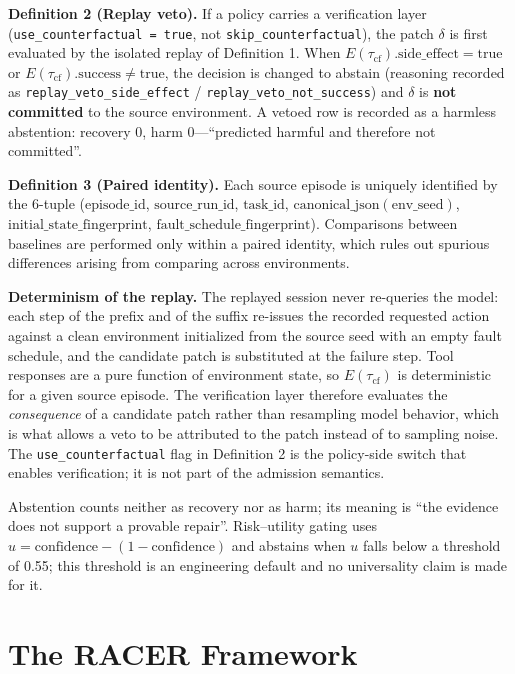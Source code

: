 \documentclass[review]{fcs}
\begin{document}
\textbf{Definition 2 (Replay veto).} If a policy carries a verification layer (\texttt{use\_counterfactual = true}, not \texttt{skip\_counterfactual}), the patch $\delta$ is first evaluated by the isolated replay of Definition 1. When $E(\tau_{\text{cf}}).\text{side\_effect} = \text{true}$ or $E(\tau_{\text{cf}}).\text{success} \neq \text{true}$, the decision is changed to abstain (reasoning recorded as \texttt{replay\_veto\_side\_effect} / \texttt{replay\_veto\_not\_success}) and $\delta$ is \textbf{not committed} to the source environment. A vetoed row is recorded as a harmless abstention: recovery 0, harm 0---``predicted harmful and therefore not committed''.

\textbf{Definition 3 (Paired identity).} Each source episode is uniquely identified by the 6-tuple ($\text{episode\_id}$, $\text{source\_run\_id}$, $\text{task\_id}$, $\text{canonical\_json}(\text{env\_seed})$, $\text{initial\_state\_fingerprint}$, $\text{fault\_schedule\_fingerprint}$). Comparisons between baselines are performed only within a paired identity, which rules out spurious differences arising from comparing across environments.

\textbf{Determinism of the replay.} The replayed session never re-queries the model: each step of the prefix and of the suffix re-issues the recorded requested action against a clean environment initialized from the source seed with an empty fault schedule, and the candidate patch is substituted at the failure step. Tool responses are a pure function of environment state, so $E(\tau_{\text{cf}})$ is deterministic for a given source episode. The verification layer therefore evaluates the \emph{consequence} of a candidate patch rather than resampling model behavior, which is what allows a veto to be attributed to the patch instead of to sampling noise. The \texttt{use\_counterfactual} flag in Definition 2 is the policy-side switch that enables verification; it is not part of the admission semantics.

Abstention counts neither as recovery nor as harm; its meaning is ``the evidence does not support a provable repair''. Risk--utility gating uses $u = \text{confidence} - (1 - \text{confidence})$ and abstains when $u$ falls below a threshold of 0.55; this threshold is an engineering default and no universality claim is made for it.

\section{The RACER Framework}
\end{document}
